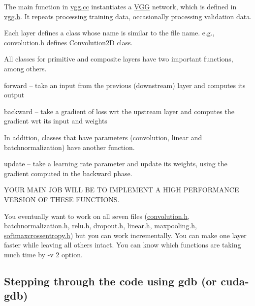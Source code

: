 The main function in \hyperlink{vgg_8cc}{vgg.\+cc} instantiates a \hyperlink{structVGG}{V\+GG} network, which is defined in \hyperlink{vgg_8h}{vgg.\+h}. It repeats processing training data, occasionally processing validation data.

Each layer defines a class whose name is similar to the file name. e.\+g., \hyperlink{convolution_8h}{convolution.\+h} defines \hyperlink{structConvolution2D}{Convolution2D} class.

All classes for primitive and composite layers have two important functions, among others.
\begin{DoxyItemize}
\item forward -- take an input from the previous (downstream) layer and computes its output
\item backward -- take a gradient of loss wrt the upstream layer and computes the gradient wrt its input and weights
\end{DoxyItemize}

In addition, classes that have parameters (convolution, linear and batchnormalization) have another function.


\begin{DoxyItemize}
\item update -- take a learning rate parameter and update its weights, using the gradient computed in the backward phase.
\end{DoxyItemize}



 Y\+O\+UR M\+A\+IN J\+OB W\+I\+LL BE TO I\+M\+P\+L\+E\+M\+E\+NT A H\+I\+GH P\+E\+R\+F\+O\+R\+M\+A\+N\+CE V\+E\+R\+S\+I\+ON OF T\+H\+E\+SE F\+U\+N\+C\+T\+I\+O\+NS. 



You eventually want to work on all seven files (\hyperlink{convolution_8h}{convolution.\+h}, \hyperlink{batchnormalization_8h}{batchnormalization.\+h}, \hyperlink{relu_8h}{relu.\+h}, \hyperlink{dropout_8h}{dropout.\+h}, \hyperlink{linear_8h}{linear.\+h}, \hyperlink{maxpooling_8h}{maxpooling.\+h}, \hyperlink{softmaxcrossentropy_8h}{softmaxcrossentropy.\+h}) but you can work incrementally. You can make one layer faster while leaving all others intact. You can know which functions are taking much time by -\/v 2 option.

\subsection*{Stepping through the code using gdb (or cuda-\/gdb) }

